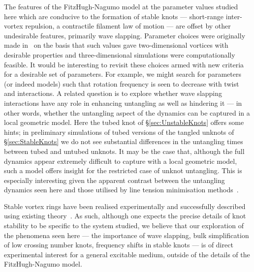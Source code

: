 The features of the FitzHugh-Nagumo model at the parameter values studied here which are conducive to the formation of stable knots --- short-range inter-vortex repulsion, a contractile filament law of motion --- are offset by other undesirable features, primarily wave slapping. Parameter choices were originally made in~\citep{Henze1993} on the basis that such values gave two-dimensional vortices with desirable properties and three-dimensional simulations were computationally feasible. It would be interesting to revisit these choices armed with new criteria for a desirable set of parameters. For example, we might search for parameters (or indeed models) such that rotation frequency is seen to decrease with twist and interactions. A related question is to explore whether wave slapping interactions have any role in enhancing untangling as well as hindering it --- in other words, whether the untangling aspect of the dynamics can be captured in a local geometric model. Here the tubed knot of \S\ref{sec:UnstableKnots} offers some hints; in preliminary simulations of tubed versions of the tangled unknots of \S\ref{sec:StableKnots} we do not see substantial differences in the untangling times between tubed and untubed unknots. It may be the case that, although the full dynamics appear extremely difficult to capture with a local geometric model, such a model offers insight for the restricted case of unknot untangling. This is especially interesting given the apparent contrast between the untangling dynamics seen here and those utilised by line tension minimisation methods~\citep{Maucher2016}. 

Stable vortex rings have been realised experimentally and successfully described using existing theory~\citep{Steinbock2006, Azhand2014, Totz2015}. As such, although one expects the precise details of knot stability to be specific to the system studied, we believe that our exploration of the phenomena seen here --- the importance of wave slapping, bulk simplification of low crossing number knots, frequency shifts in stable knots --- is of direct experimental interest for a general excitable medium, outside of the details of the FitzHugh-Nagumo model. 
